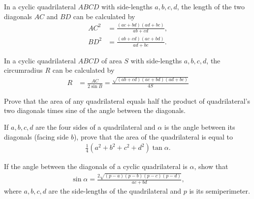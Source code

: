 \begin{tcolorbox}[title={Calculating Diagonals and Circumradius of Cyclic Quadrilaterals}]
    \begin{question}[name=Trigonometry of Quadrilateral Diagonals]
        In a cyclic quadrilateral $ABCD$ with side-lengths $a,b,c,d$, the length of the two diagonals $AC$ and $BD$ can be calculated by
        \begin{align*}
            AC^2 &= \frac{(ac+bd)(ad+bc)}{ab+cd},\\
            BD^2 &= \frac{(ab+cd)(ac+bd)}{ad+bc}.
        \end{align*}
    \end{question}

    \begin{question}[name=Calculating Circumradius of Quadrilateral]
        In a cyclic quadrilateral $ABCD$ of area $S$ with side-lengths $a,b,c,d$, the circumradius $R$ can be calculated by
        \begin{align*}
            R &= \frac{AC}{2\sin B}=\frac{\sqrt{(ab+cd)(ac+bd)(ad+bc)}}{4S}
        \end{align*}
    \end{question}
\end{tcolorbox}


\begin{question}
    Prove that the area of any quadrilateral equals half the product of quadrilateral's two diagonals times sine of the angle between the diagonals.
\end{question}


\begin{question}
    If $a,b,c,d$ are the four sides of a quadrilateral and $\alpha$ is the angle between its diagonals (facing side $b$), prove that the area of the quadrilateral is equal to
    \begin{align*}
        \frac{1}{4}\left(a^2+b^2+c^2+d^2\right)\tan \alpha.
    \end{align*}
\end{question}


\begin{question}
    If the angle between the diagonals of a cyclic quadrilateral is $\alpha$, show that
    \begin{align*}
        \sin \alpha = \frac{2\sqrt{(p-a)(p-b)(p-c)(p-d)}}{ac+bd},
    \end{align*}
    where $a,b,c,d$ are the side-lengths of the quadrilateral and $p$ is its semiperimeter.
\end{question}

